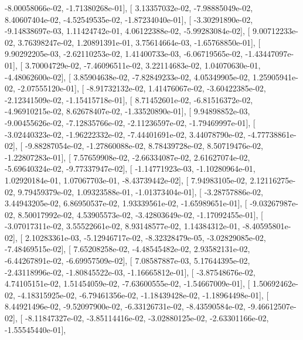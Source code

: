 \documentclass{article}
\begin{document}
         -8.00058066e-02,  -1.71380268e-01],
       [  3.13357032e-02,  -7.98885049e-02,   8.40607404e-02,
         -4.52549535e-02,  -1.87234040e-01],
       [ -3.30291890e-02,  -9.14838697e-03,   1.11424742e-01,
          4.06122388e-02,  -5.99283084e-02],
       [  9.00712233e-02,   3.76398247e-02,   1.20891391e-01,
          3.75614664e-03,  -1.65768850e-01],
       [  9.90292205e-03,  -2.62110253e-02,   1.41400733e-03,
         -6.06719565e-02,  -1.43447097e-01],
       [  3.70004729e-02,  -7.46096511e-02,   3.22114683e-02,
          1.04070630e-01,  -4.48062600e-02],
       [  3.85904638e-02,  -7.82849233e-02,   4.05349905e-02,
          1.25905941e-02,  -2.07555120e-01],
       [ -8.91732132e-02,   1.41476067e-02,  -3.60422385e-02,
         -2.12341509e-02,  -1.15415718e-01],
       [  8.71452601e-02,  -6.81516372e-02,  -4.96910215e-02,
          8.62678407e-02,  -1.33520890e-01],
       [  9.94898852e-03,  -9.00455626e-02,  -7.12835766e-02,
         -2.11236597e-02,  -1.79469997e-01],
       [ -3.02440323e-02,  -1.96222332e-02,  -7.44401691e-02,
          3.44078790e-02,  -4.77738861e-02],
       [ -9.88287054e-02,  -1.27860088e-02,   8.78439728e-02,
          8.50719476e-02,  -1.22807283e-01],
       [  7.57659908e-02,  -2.66334087e-02,   2.61627074e-02,
         -5.69640324e-02,  -9.77337947e-02],
       [ -1.14771923e-03,  -1.10280964e-01,   1.02920184e-01,
          1.07067703e-01,  -8.43739442e-02],
       [  7.94983105e-02,   2.12116275e-02,   9.79459379e-02,
          1.09323588e-01,  -1.01373404e-01],
       [ -3.28757886e-02,   3.44943205e-02,   6.86950537e-02,
          1.93339561e-02,  -1.65989651e-01],
       [ -9.03267987e-02,   8.50017992e-02,   4.53905573e-02,
         -3.42803649e-02,  -1.17092455e-01],
       [ -3.07017311e-02,   3.55522661e-02,   8.93148577e-02,
          1.14384312e-01,  -8.40595801e-02],
       [  2.10283361e-03,  -5.12946717e-02,  -8.32328479e-05,
         -3.02829085e-02,  -7.48469515e-02],
       [  7.65208258e-02,  -4.48545482e-02,   2.93582131e-02,
         -6.44267891e-02,  -6.69957509e-02],
       [  7.08587887e-03,   5.17644395e-02,  -2.43118996e-02,
         -1.80845522e-03,  -1.16665812e-01],
       [ -3.87548676e-02,   4.74105151e-02,   1.51454059e-02,
         -7.63600555e-02,  -1.54667009e-01],
       [  1.50692462e-02,  -4.18315925e-02,  -6.79461356e-02,
         -1.18439428e-02,  -1.18964498e-01],
       [  8.44921496e-02,  -9.52097900e-02,  -6.33126731e-02,
         -8.43590584e-02,  -9.46612507e-02],
       [ -8.11847327e-02,  -3.85114416e-02,  -3.02880125e-02,
         -2.63301166e-02,  -1.55545440e-01],
\end{document}
